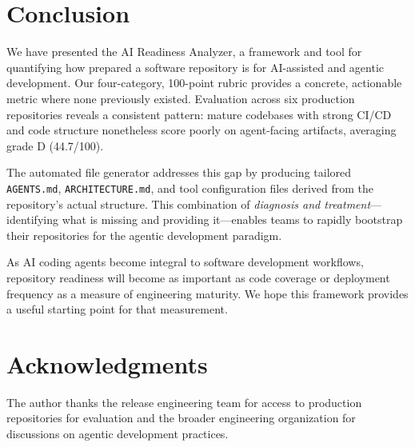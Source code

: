 \documentclass[11pt,twocolumn]{article}
\begin{document}
\section{Conclusion}
\label{sec:conclusion}

We have presented the AI Readiness Analyzer, a framework and tool for
quantifying how prepared a software repository is for AI-assisted and
agentic development. Our four-category, 100-point rubric provides a
concrete, actionable metric where none previously existed. Evaluation
across six production repositories reveals a consistent pattern: mature
codebases with strong CI/CD and code structure nonetheless score poorly
on agent-facing artifacts, averaging grade D (44.7/100).

The automated file generator addresses this gap by producing tailored
\texttt{AGENTS.md}, \texttt{ARCHITECTURE.md}, and tool configuration
files derived from the repository's actual structure. This combination
of \emph{diagnosis and treatment}---identifying what is missing and
providing it---enables teams to rapidly bootstrap their repositories
for the agentic development paradigm.

As AI coding agents become integral to software development workflows,
repository readiness will become as important as code coverage or
deployment frequency as a measure of engineering maturity. We hope this
framework provides a useful starting point for that measurement.

\section*{Acknowledgments}

The author thanks the release engineering team for access to production
repositories for evaluation and the broader engineering organization
for discussions on agentic development practices.


\end{document}
